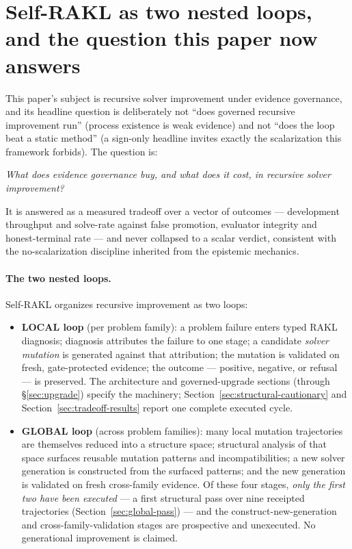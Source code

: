 \section{Self-RAKL as two nested loops, and the question this paper now answers}
\label{sec:nested-loops}

This paper's subject is recursive solver improvement under evidence governance, and its
headline question is deliberately not ``does governed recursive improvement run''
(process existence is weak evidence) and not ``does the loop beat a static method''
(a sign-only headline invites exactly the scalarization this framework forbids). The
question is:

\begin{center}
\emph{What does evidence governance buy, and what does it cost, in recursive solver
improvement?}
\end{center}

\noindent It is answered as a measured tradeoff over a vector of outcomes ---
development throughput and solve-rate against false promotion, evaluator integrity and
honest-terminal rate --- and never collapsed to a scalar verdict, consistent with the
no-scalarization discipline inherited from the epistemic mechanics.

\paragraph{The two nested loops.}
Self-RAKL organizes recursive improvement as two loops:

\begin{itemize}[leftmargin=1.4em,itemsep=2pt]
\item \textbf{LOCAL loop} (per problem family): a problem failure enters typed RAKL
diagnosis; diagnosis attributes the failure to one stage; a candidate \emph{solver
mutation} is generated against that attribution; the mutation is validated on fresh,
gate-protected evidence; the outcome --- positive, negative, or refusal --- is
preserved. The architecture and governed-upgrade sections (through
\S\ref{sec:upgrade}) specify the machinery; Section~\ref{sec:structural-cautionary}
and Section~\ref{sec:tradeoff-results} report one complete executed cycle.
\item \textbf{GLOBAL loop} (across problem families): many local mutation trajectories
are themselves reduced into a structure space; structural analysis of that space
surfaces reusable mutation patterns and incompatibilities; a new solver generation is
constructed from the surfaced patterns; and the new generation is validated on fresh
cross-family evidence. Of these four stages, \emph{only the first two have been
executed} --- a first structural pass over nine receipted trajectories
(Section~\ref{sec:global-pass}) --- and the construct-new-generation and
cross-family-validation stages are prospective and unexecuted. No generational
improvement is claimed.
\end{itemize}

